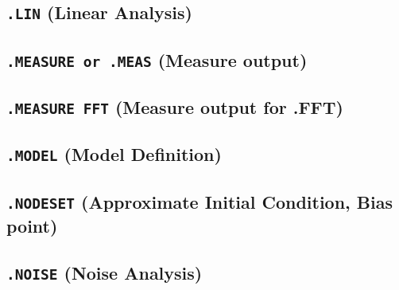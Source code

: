 \newpage
\subsection{\texttt{.LIN} (Linear Analysis)}


\newpage
\subsection{\texttt{.MEASURE or .MEAS} (Measure output)}


\newpage
\subsection{\texttt{.MEASURE FFT} (Measure output for .FFT)}


\newpage
\subsection{\texttt{.MODEL} (Model Definition)}



\newpage
\subsection{\texttt{.NODESET} (Approximate Initial Condition, Bias point)}


\newpage
\subsection{\texttt{.NOISE} (Noise Analysis) }
 



